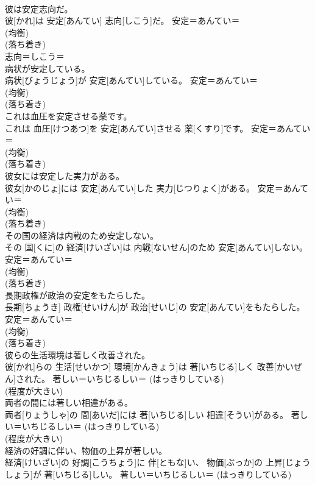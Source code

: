 \documentclass[8pt]{extreport}
\begin{document}
\begin{CJK}{UTF8}{min}
{\\	彼は安定志向だ。	
\\	彼[かれ]は 安定[あんてい] 志向[しこう]だ。	安定＝あんてい＝ 
\\	(均衡) 
\\	(落ち着き) 
\\	志向＝しこう＝ 
\\	病状が安定している。	
\\	病状[びょうじょう]が 安定[あんてい]している。	安定＝あんてい＝ 
\\	(均衡) 
\\	(落ち着き) 
\\	これは血圧を安定させる薬です。	
\\	これは 血圧[けつあつ]を 安定[あんてい]させる 薬[くすり]です。	安定＝あんてい＝ 
\\	(均衡) 
\\	(落ち着き) 
\\	彼女には安定した実力がある。	
\\	彼女[かのじょ]には 安定[あんてい]した 実力[じつりょく]がある。	安定＝あんてい＝ 
\\	(均衡) 
\\	(落ち着き) 
\\	その国の経済は内戦のため安定しない。	
\\	その 国[くに]の 経済[けいざい]は 内戦[ないせん]のため 安定[あんてい]しない。	安定＝あんてい＝ 
\\	(均衡) 
\\	(落ち着き) 
\\	長期政権が政治の安定をもたらした。	
\\	長期[ちょうき] 政権[せいけん]が 政治[せいじ]の 安定[あんてい]をもたらした。	安定＝あんてい＝ 
\\	(均衡) 
\\	(落ち着き) 
\\	彼らの生活環境は著しく改善された。	
\\	彼[かれ]らの 生活[せいかつ] 環境[かんきょう]は 著[いちじる]しく 改善[かいぜん]された。	著しい＝いちじるしい＝ (はっきりしている) 
\\	(程度が大きい) 
\\	両者の間には著しい相違がある。	
\\	両者[りょうしゃ]の 間[あいだ]には 著[いちじる]しい 相違[そうい]がある。	著しい＝いちじるしい＝ (はっきりしている) 
\\	(程度が大きい) 
\\	経済の好調に伴い、物価の上昇が著しい。	
\\	経済[けいざい]の 好調[こうちょう]に 伴[ともな]い、 物価[ぶっか]の 上昇[じょうしょう]が 著[いちじる]しい。	著しい＝いちじるしい＝ (はっきりしている) 
}
\end{CJK}
\end{document}
